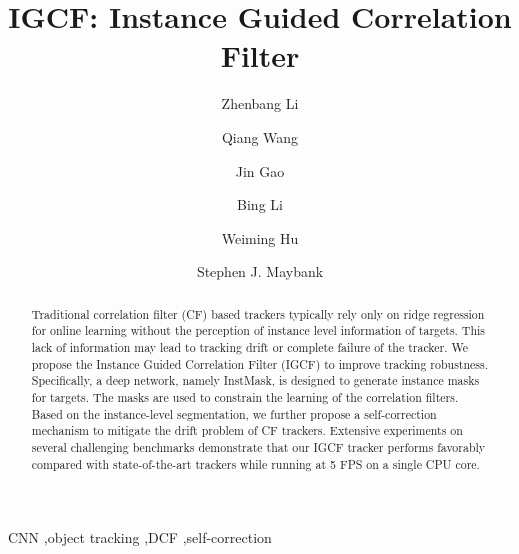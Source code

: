 \documentclass[review]{elsarticle}
\begin{document}
\begin{frontmatter}

\title{IGCF: Instance Guided Correlation Filter}

\author[address1,address3]{Zhenbang Li}
\author[address1,address3]{Qiang Wang}
\author[address1]{Jin Gao}
\author[address1]{Bing Li}
\author[address1,address2,address3]{Weiming Hu}
\author[address4]{Stephen J. Maybank}
\address[address1]{National Laboratory of Pattern Recognition, Institute of Automation, Chinese Academy of Sciences, Beijing 100190, PR China}
\address[address2]{CAS Center for Excellence in Brain Science and Intelligence Technology, Chinese Academy of Sciences, Beijing 100190, PR China}
\address[address3]{University of Chinese Academy of Sciences, Beijing 100190, PR China}
\address[address4]{Department of Computer Science and Information Systems, Birkbeck College, London WC1E 7HX, United Kingdom}

\begin{abstract}
Traditional correlation filter (CF) based trackers typically rely only on ridge regression for online learning without the perception of instance level information of targets. This lack of information may lead to tracking drift or complete failure of the tracker. We propose the Instance Guided Correlation Filter (IGCF) to improve tracking robustness. Specifically, a deep network, namely InstMask, is designed to generate instance masks for targets. The masks are used to constrain the learning of the correlation filters. Based on the instance-level segmentation, we further propose a self-correction mechanism to mitigate the drift problem of CF trackers. Extensive experiments on several challenging benchmarks demonstrate that our IGCF tracker performs favorably compared with state-of-the-art trackers while running at 5 FPS on a single CPU core.
\end{abstract}

\begin{keyword}
CNN \sep object tracking \sep DCF \sep self-correction
\end{keyword}

\end{frontmatter}

\linenumbers
\end{document}

